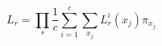 \documentclass{standalone}
\begin{document}
\begin{minipage}{3in}
\[
L_{r} = \prod_{s}\frac{1}{c}\sum_{i=1}^c \sum_{x_j} L_{r}^{i}(x_j) \pi_{x_j}
\]
\end{minipage}
\end{document}
